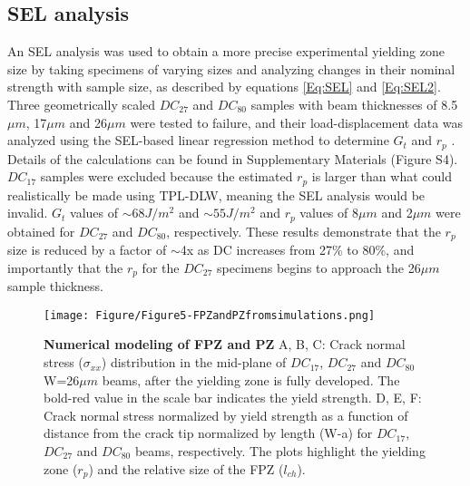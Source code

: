 \documentclass[11pt]{article}
\providecommand{\um}[0]{$\mu m$}
\providecommand{\rp}[0]{$r_p$}
\providecommand{\lch}[0]{$l_{ch}$}
\providecommand{\SI}[0]{Supplementary Materials}
\providecommand{\DCi}[0]{$DC_{17}$}
\providecommand{\DCj}[0]{$DC_{27}$}
\providecommand{\DCk}[0]{$DC_{80}$}
\providecommand{\Gt}[0]{$G_{t}$}
\begin{document}
        \subsection{SEL analysis} \label{SEL analysis}
        An SEL analysis was used to obtain a more precise experimental yielding zone size by taking specimens of varying sizes and analyzing changes in their nominal strength with sample size, as described by equations \ref{Eq:SEL} and \ref{Eq:SEL2}.
        Three geometrically scaled \DCj{} and \DCk{} samples with beam thicknesses of 8.5\um{}, 17\um{} and 26\um{} were tested to failure, and their load-displacement data was analyzed using the SEL-based linear regression method to determine \Gt{} and \rp{} \cite{nguyen2021structural}.
        Details of the calculations can be found in \SI{} (Figure S4).
        \DCi{} samples were excluded because the estimated \rp{} is larger than what could realistically be made using TPL-DLW, meaning the SEL analysis would be invalid.
        \Gt{} values of $\sim 68 J/m^2$ and $\sim 55 J/m^2$ and \rp{} values of 8\um{} and 2\um{} were obtained for \DCj{} and \DCk{}, respectively. 
        These results demonstrate that the \rp{} size is reduced by a factor of $\sim$4x as DC increases from 27\% to 80\%, and importantly that the \rp{} for the \DCj{} specimens begins to approach the 26\um{} sample thickness.

        \begin{figure*}[ht!]
                \texttt{[image: Figure/Figure5-FPZandPZfromsimulations.png]}
                \caption{\textbf{Numerical modeling of FPZ and PZ} 
                A, B, C: Crack normal stress ($\sigma_{xx}$) distribution in the mid-plane of \DCi{}, \DCj{} and \DCk{} W=26\um{} beams, after the yielding zone is fully developed.
                The bold-red value in the scale bar indicates the yield strength. 
                D, E, F: Crack normal stress normalized by yield strength as a function of distance from the crack tip normalized by length (W-a) for \DCi{}, \DCj{} and \DCk{} beams, respectively.  
                The plots highlight the yielding zone ($r_p$) and the relative size of the FPZ (\lch{}).}
                \label{fig:Figure5}
        \end{figure*}
        
\end{document}
